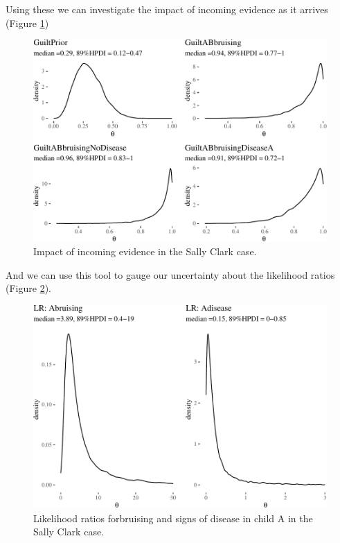 \documentclass[
  10pt,
  dvipsnames,enabledeprecatedfontcommands]{scrartcl}
\begin{document}
\pagebreak

Using these we can investigate the impact of incoming evidence as it
arrives (Figure \ref{fig:SCwithHOP2})

\begin{figure}

\begin{center}\includegraphics[width=0.9\linewidth]{imprecision_weight_files/figure-latex/SCwithHOP2-1} \end{center}


\caption{Impact of incoming evidence in the Sally Clark case.}
\label{fig:SCwithHOP2}
\end{figure}

And we can use this tool to gauge our uncertainty about the likelihood
ratios (Figure \ref{fig:SClrs}).

\begin{figure}


\begin{center}\includegraphics[width=0.9\linewidth]{imprecision_weight_files/figure-latex/SClrs-1} \end{center}

\caption{Likelihood ratios forbruising and signs of disease in child A in the Sally Clark case.}
\label{fig:SClrs}

\end{figure}
\end{document}
